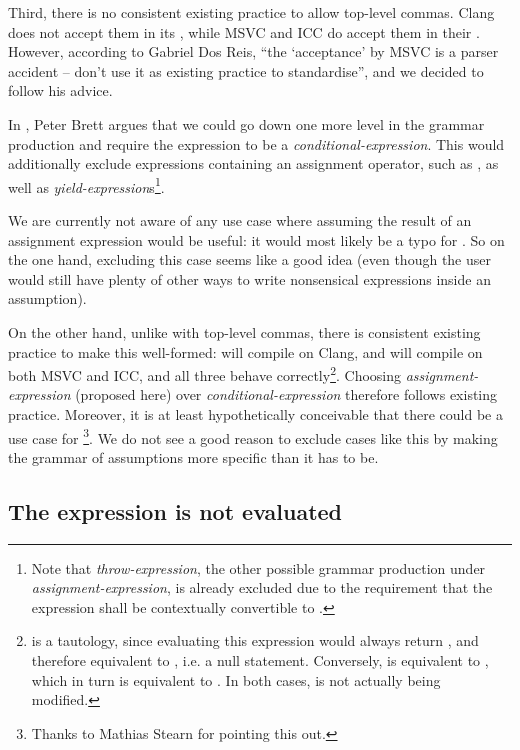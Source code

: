 Third, there is no consistent existing practice to allow top-level commas. Clang does not accept them in its , while MSVC and ICC do accept them in their . However, according to Gabriel Dos Reis, ``the `acceptance' by MSVC is a parser accident -- don't use it as existing practice to standardise'', and we decided to follow his advice.

In \cite{P2507R0}, Peter Brett argues that we could go down one more level in the grammar production and require the expression to be a \emph{conditional-expression}. This would additionally exclude expressions containing an assignment operator, such as \tcode{[[assume(x = 1)]]}, as well as \emph{yield-expression}s\footnote{Note that \emph{throw-expression}, the other possible grammar production under \emph{assignment-expression}, is already excluded due to the requirement that the expression shall be contextually convertible to .}.

We are currently not aware of any use case where assuming the result of an assignment expression would be useful: it would most likely be a typo for \tcode{[[assume(x == 1)]]}. So on the one hand, excluding this case seems like a good idea (even though the user would still have plenty of other ways to write nonsensical expressions inside an assumption).

On the other hand, unlike with top-level commas, there is consistent existing practice to make this well-formed:  will compile on Clang, and  will compile on both MSVC and ICC, and all three behave correctly\footnote{ is a tautology, since evaluating this expression would always return , and therefore equivalent to , i.e. a null statement. Conversely,  is equivalent to , which in turn is equivalent to . In both cases,  is not actually being modified.}. Choosing \emph{assignment-expression} (proposed here) over \emph{conditional-expression} therefore follows existing practice. Moreover, it is at least hypothetically conceivable that there could be a use case for \footnote{Thanks to Mathias Stearn for pointing this out.}. We do not see a good reason to exclude cases like this by making the grammar of assumptions more specific than it has to be.

\subsection{The expression is not evaluated}


